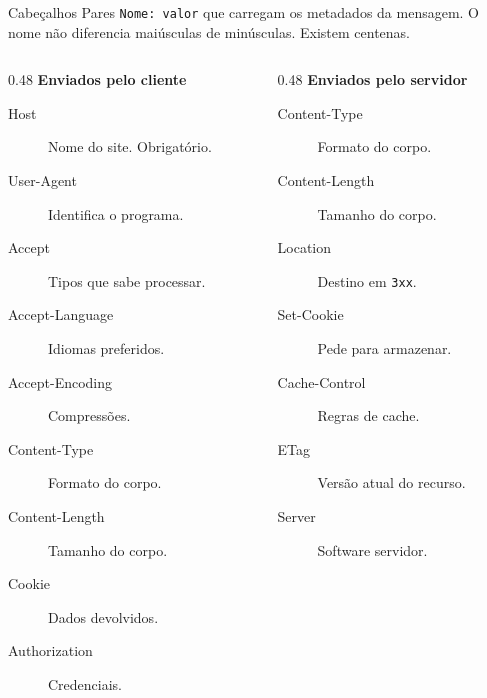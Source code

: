 \documentclass{beamer}
\begin{document}

\begin{frame}{Cabeçalhos}
  Pares \texttt{Nome: valor} que carregam os metadados da mensagem.
  O nome não diferencia maiúsculas de minúsculas. Existem centenas.

  \begin{columns}[t]
    \begin{column}{0.48\textwidth}
      \textbf{Enviados pelo cliente}
      \scriptsize
      \begin{description}
        \item[Host] Nome do site. Obrigatório.
        \item[User-Agent] Identifica o programa.
        \item[Accept] Tipos que sabe processar.
        \item[Accept-Language] Idiomas preferidos.
        \item[Accept-Encoding] Compressões.
        \item[Content-Type] Formato do corpo.
        \item[Content-Length] Tamanho do corpo.
        \item[Cookie] Dados devolvidos.
        \item[Authorization] Credenciais.
      \end{description}
    \end{column}
    \begin{column}{0.48\textwidth}
      \textbf{Enviados pelo servidor}
      \scriptsize
      \begin{description}
        \item[Content-Type] Formato do corpo.
        \item[Content-Length] Tamanho do corpo.
        \item[Location] Destino em \texttt{3xx}.
        \item[Set-Cookie] Pede para armazenar.
        \item[Cache-Control] Regras de cache.
        \item[ETag] Versão atual do recurso.
        \item[Server] Software servidor.
      \end{description}
    \end{column}
  \end{columns}
\end{frame}
\end{document}
